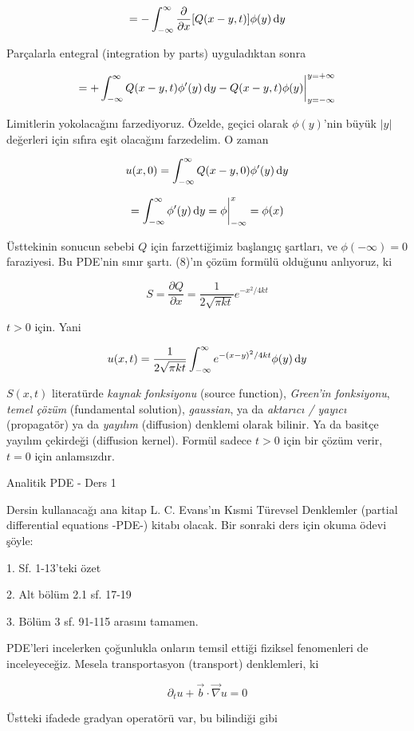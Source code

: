 \documentclass[12pt,fleqn]{article}\usepackage{../../common}
\begin{document}
$$ = -\int_{-\infty}^{\infty} 
\frac{\partial }{\partial x}[Q(x-y,t)]\phi(y)\,\mathrm{d} y
  $$

Parçalarla entegral (integration by parts) uyguladıktan sonra 

$$ 
=  + \int_{-\infty}^{\infty}  Q(x-y,t)\phi'(y)\,\mathrm{d} y - 
Q(x-y,t)\phi(y) \bigg|_{y=-\infty}^{y=+\infty}
$$

Limitlerin yokolacağını farzediyoruz. Özelde, geçici olarak $\phi(y)$'nin
büyük $|y|$ değerleri için sıfıra eşit olacağını farzedelim. O zaman 

$$ u(x,0) = 
\int_{-\infty}^{\infty} Q(x-y, 0) \phi'(y)\,\mathrm{d} y 
 $$

$$ 
= \int_{-\infty}^{\infty} \phi'(y)\,\mathrm{d} y = \phi \bigg|_{-\infty}^{x} = \phi(x)
$$

Üsttekinin sonucun sebebi $Q$ için farzettiğimiz başlangıç şartları, ve
$\phi(-\infty) = 0$ faraziyesi. Bu PDE'nin sınır şartı. (8)'ın çözüm
formülü olduğunu anlıyoruz, ki 

$$ S = \frac{\partial Q}{\partial x} = \frac{ 1}{2\sqrt{\pi kt}} 
e^{ -x^2 / 4kt}
$$

$t>0$ için. Yani 

$$
u(x,t) =  \frac{ 1}{2\sqrt{\pi kt}} 
\int_{-\infty}^{\infty} e^{-(x-y)^2 / 4kt} \phi(y) \,\mathrm{d} y
$$

$S(x,t)$ literatürde {\em kaynak fonksiyonu} (source function), {\em Green'in
fonksiyonu}, {\em temel çözüm} (fundamental solution), {\em gaussian}, ya
da {\em aktarıcı / yayıcı} (propagatör) ya da {\em yayılım} (diffusion) denklemi
olarak bilinir. Ya da basitçe yayılım çekirdeği (diffusion kernel). Formül
sadece $t>0$ için bir çözüm verir, $t=0$ için anlamsızdır. 


Analitik PDE - Ders 1

Dersin kullanacağı ana kitap L. C. Evans'ın Kısmi Türevsel Denklemler
(partial differential equations -PDE-) kitabı olacak. Bir sonraki ders için
okuma ödevi şöyle:

1. Sf. 1-13'teki özet

2. Alt bölüm 2.1 sf. 17-19

3. Bölüm 3 sf. 91-115 arasını tamamen. 

PDE'leri incelerken çoğunlukla onların temsil ettiği fiziksel fenomenleri
de inceleyeceğiz. Mesela transportasyon (transport) denklemleri, ki

$$ \partial_t u + \vec{b} \cdot \vec{\nabla} u = 0 $$

Üstteki ifadede gradyan operatörü var, bu bilindiği gibi
\end{document}
